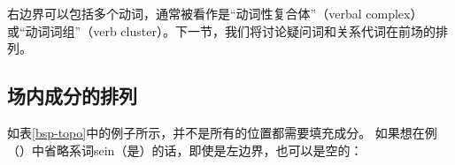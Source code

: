 右边界可以包括多个动词，通常被看作是“动词性复合体”（verbal complex）或“动词词组”（verb cluster）。下一节，我们将讨论疑问词和关系代词在前场的排列。

\subsection{场内成分的排列}

如表\ref{bsp-topo}中的例子所示，并不是所有的位置都需要填充成分。
如果想在例（）中省略系词sein（是）的话，即使是左边界，也可以是空的：
\eal
\ex


